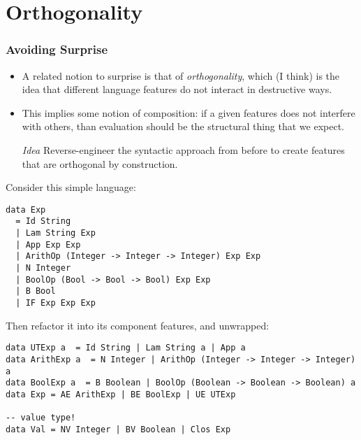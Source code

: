 \documentclass{beamer}
\begin{document}
\section{Orthogonality}

\begin{frame}[fragile]
  \frametitle{Avoiding Surprise}
  \begin{itemize}

  \item A related notion to surprise is that of \emph{orthogonality}, which (I
    think) is the idea that different language features do not interact in
    destructive ways.

  \item This implies some notion of composition: if a given features does
    not interfere with others, than evaluation should be the structural thing
    that we expect. 

  \item[\emph{Idea}] Reverse-engineer the syntactic approach from before to
    create features that are orthogonal by construction.

  \end{itemize}

\end{frame}
\begin{frame}[fragile]
  Consider this simple language:
\begin{verbatim}
data Exp 
  = Id String 
  | Lam String Exp 
  | App Exp Exp 
  | ArithOp (Integer -> Integer -> Integer) Exp Exp 
  | N Integer
  | BoolOp (Bool -> Bool -> Bool) Exp Exp
  | B Bool
  | IF Exp Exp Exp
\end{verbatim}
\end{frame}

\begin{frame}[fragile]
  Then refactor it into its component features, and unwrapped:
  \begin{verbatim}
data UTExp a  = Id String | Lam String a | App a
data ArithExp a  = N Integer | ArithOp (Integer -> Integer -> Integer) a
data BoolExp a  = B Boolean | BoolOp (Boolean -> Boolean -> Boolean) a
data Exp = AE ArithExp | BE BoolExp | UE UTExp

-- value type!
data Val = NV Integer | BV Boolean | Clos Exp
\end{verbatim}

\end{frame}
\end{document}
